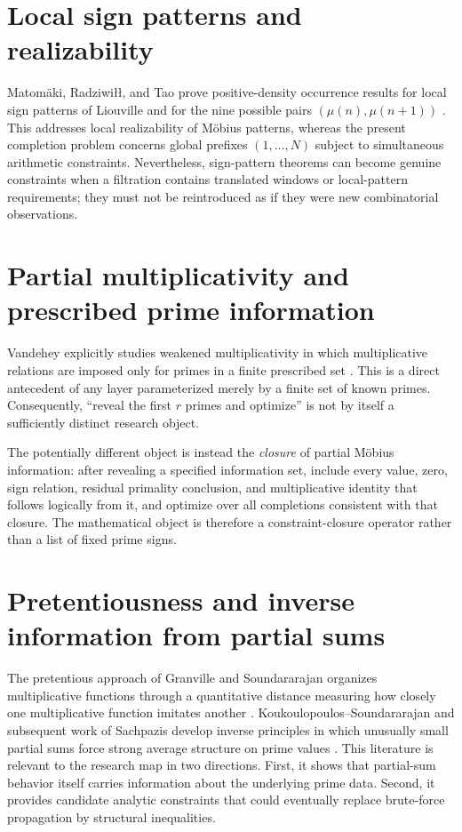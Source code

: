 \documentclass[11pt]{article}
\begin{document}
\section{Local sign patterns and realizability}
Matomäki, Radziwiłł, and Tao prove positive-density occurrence results for local sign patterns of Liouville and for the nine possible pairs $(\mu(n),\mu(n+1))$ \cite{MRT2016}.  This addresses local realizability of Möbius patterns, whereas the present completion problem concerns global prefixes $(1,\ldots,N)$ subject to simultaneous arithmetic constraints.  Nevertheless, sign-pattern theorems can become genuine constraints when a filtration contains translated windows or local-pattern requirements; they must not be reintroduced as if they were new combinatorial observations.

\section{Partial multiplicativity and prescribed prime information}
Vandehey explicitly studies weakened multiplicativity in which multiplicative relations are imposed only for primes in a finite prescribed set \cite{Vandehey2012}.  This is a direct antecedent of any layer parameterized merely by a finite set of known primes.  Consequently, ``reveal the first $r$ primes and optimize'' is not by itself a sufficiently distinct research object.

The potentially different object is instead the \emph{closure} of partial Möbius information: after revealing a specified information set, include every value, zero, sign relation, residual primality conclusion, and multiplicative identity that follows logically from it, and optimize over all completions consistent with that closure.  The mathematical object is therefore a constraint-closure operator rather than a list of fixed prime signs.

\section{Pretentiousness and inverse information from partial sums}
The pretentious approach of Granville and Soundararajan organizes multiplicative functions through a quantitative distance measuring how closely one multiplicative function imitates another \cite{GranvilleSound2007}.  Koukoulopoulos--Soundararajan and subsequent work of Sachpazis develop inverse principles in which unusually small partial sums force strong average structure on prime values \cite{KoukSound2020,Sachpazis2024}.  This literature is relevant to the research map in two directions.  First, it shows that partial-sum behavior itself carries information about the underlying prime data.  Second, it provides candidate analytic constraints that could eventually replace brute-force propagation by structural inequalities.
\end{document}
